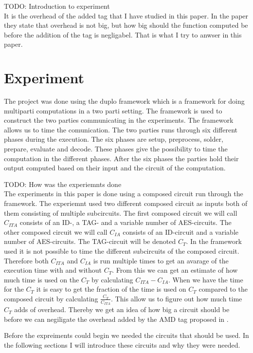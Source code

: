 \documentclass[10pt,a4paper]{article}
\newcommand{\todo}[1]{}
\renewcommand{\todo}[1]{{\color{red} TODO: {#1}} \\}
\begin{document}
\todo{Introduction to experiment}
It is the overhead of the added tag that I have studied in this paper. In the paper they state that overhead is not big, but how big should the function computed be before the addition of the tag is negligabel. That is what I try to anwser in this paper.


\section{Experiment}
The project was done using the duplo framework which is a framework for doing multiparti computations in a two parti setting. The framework is used to construct the two parties communicating in the experiments. The framework allows us to time the comunication. The two parties runs through six different phases during the execution. The six phases are setup, preprocess, solder, prepare, evaluate and decode. These phases give the possibility to time the computation in the different phases. After the six phases the parties hold their output computed based on their input and the circuit of the computation.

\todo{How was the experiemnts done}

The experiments in this paper is done using a composed circuit run through the framework. The experiemnt used two different composed circuit as inputs both of them consisting of multiple subcircuits. The first composed circuit we will call $C_{ITA}$ consists of an ID-, a TAG- and a variable number of AES-circuits. The other composed circuit we will call $C_{IA}$ consists of an ID-circuit and a variable number of AES-circuits. The TAG-circuit will be denoted $C_{T}$. In the framework used it is not possible to time the different subcircuits of the composed circuit. Therefore both $C_{ITA}$ and $C_{IA}$ is run multiple times to get an avarage of the execution time with and without $C_{T}$. From this we can get an estimate of how much time is used on the $C_{T}$ by calculating $C_{ITA}-C_{IA}$. When we have the time for the $C_{T}$ it is easy to get the fraction of the time is used on $C_{T}$ compared to the composed circuit by calculating $\frac{C_{T}}{C_{ITA}}$. This allow us to figure out how much time $C_{T}$ adds of overhead. Thereby we get an idea of how big a circuit should be before we can negiligate the overhead added by the AMD tag proposed in \cite{fosc}.

Before the expreiments could begin we needed the circuits that should be used. In the following sections I will introduce these circuits and why they were needed.
\end{document}
